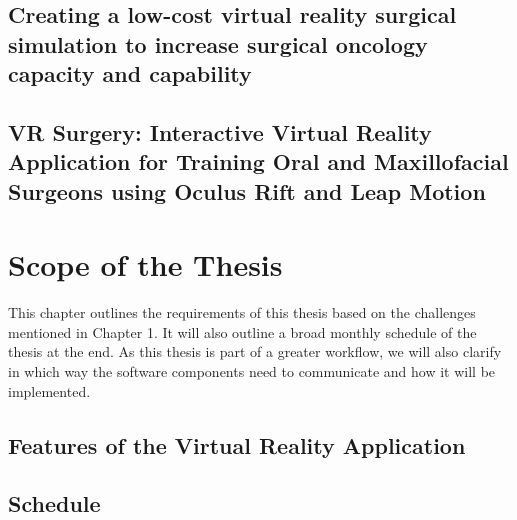 \documentclass[twoside, parskip]{VRThesis} %
\begin{document}
\section{\label{sec::RelatedWork1}Creating a low-cost virtual reality surgical simulation to increase surgical oncology capacity and capability}


\section{\label{sec::RelatedWork2}VR Surgery: Interactive Virtual Reality Application for Training Oral and Maxillofacial Surgeons using Oculus Rift and Leap Motion}


\chapter{Scope of the Thesis}

This chapter outlines the requirements of this thesis based on the challenges mentioned in Chapter 1.
It will also outline a broad monthly schedule of the thesis at the end.
As this thesis is part of a greater workflow, we will also clarify in which way the software components need to communicate and how it will be implemented.

\section{\label{sec::Features}Features of the Virtual Reality Application}


\section{Schedule}




%
\end{document}
